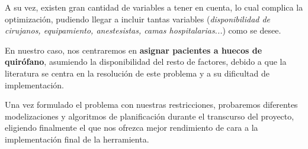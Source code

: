 A su vez, existen gran cantidad de variables a tener en cuenta, lo cual complica \cite{Lin2020AScheduling} la optimización, pudiendo llegar a incluir tantas variables (\textit{disponibilidad de cirujanos, equipamiento, anestesistas, camas hospitalarias...}) como se desee.

En nuestro caso, nos centraremos en \textbf{asignar pacientes a huecos de quirófano}, asumiendo la disponibilidad del resto de factores, debido a que la literatura se centra en la resolución de este problema y a su dificultad de implementación.

Una vez formulado el problema con nuestras restricciones, probaremos diferentes modelizaciones y algoritmos de planificación durante el transcurso del proyecto, eligiendo finalmente el que nos ofrezca mejor rendimiento de cara a la implementación final de la herramienta.

